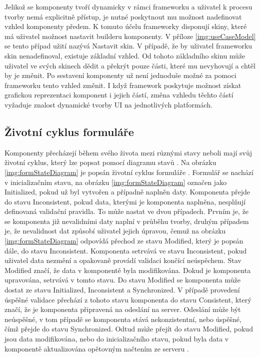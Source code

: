 Jelikož se komponenty tvoří dynamicky v rámci frameworku a uživatel k procesu tvorby nemá explicitně přístup, je nutné poskytnout mu možnost nadefinovat vzhled komponenty předem. K tomuto účelu frameworky disponují skiny, které má uživatel možnost nastavit builderu komponenty. V příloze \ref{img:useCaseModel} se tento případ užití nazývá Nastavit skin. V případě, že by uživatel frameworku skin nenadefinoval, existuje základní vzhled. Od tohoto základního skinu může uživatel ve svých skinech dědit a překrýt pouze části, které mu nevyhovují a chtěl by je změnit. Po sestavení komponenty už není jednoduše možné za pomoci frameworku tento vzhled změnit. I když framework poskytuje možnost získat grafickou reprezentaci komponent i jejich částí, změna vzhledu těchto částí vyžaduje znalost dynamické tvorby UI na jednotlivých platformách.

\subsection{Životní cyklus formuláře}

Komponenty přecházejí během svého života mezi různými stavy neboli mají svůj životní cyklus, který lze popsat pomocí diagramu stavů \cite{UmlArlow}. Na obrázku \ref{img:formStateDiagram} je popsán životní cyklus formuláře \cite{tomasek-thesis}. Formulář se nachází v inicializačním stavu, na obrázku \ref{img:formStateDiagram} označen jako Initialized, pokud už byl vytvořen a případně naplněn daty. Komponenta přejde do stavu Inconsistent, pokud data, kterými je komponenta naplněna, nesplňují definovaná validační pravidla. To může nastat ve dvou případech. Prvním je, že se komponenta již nevalidními daty naplní v průběhu tvorby, druhým případem je, že nevalidnost dat způsobí uživatel jejich úpravou, čemuž na obrázku \ref{img:formStateDiagram} odpovídá přechod ze stavu Modified, který je popsán dále, do stavu Inconsistent. Komponenta setrvává ve stavu Inconsistent, pokud uživatel data nezmění a opakovaně provádí validaci končící neúspěchem. Stav Modified značí, že data v komponentě byla modifikována. Dokud je komponenta upravována, setrvává v tomto stavu. Do stavu Modified se komponenta může dostat ze stavu Initialized, Inconsistent a Synchronized. V případě provedení úspěšné validace přechází z tohoto stavu komponenta do stavu Consistent, který značí, že je komponenta připravená na odeslání na server. Odeslání může být neúspěšné, v tom případě se komponenta stává nekonzistentní, nebo úspěšné, čímž přejde do stavu Synchronized. Odtud může přejít do stavu Modified, pokud jsou data modifikována, nebo do inicializačního stavu, pokud byla data v komponentě aktualizována opětovným načtením ze serveru \cite{tomasek-thesis}.

